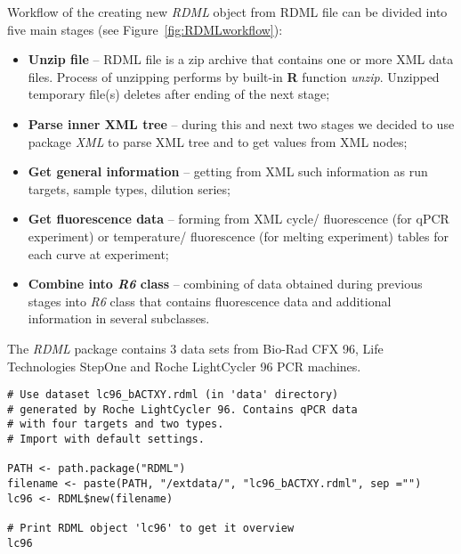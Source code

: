 \documentclass{bioinfo}
\begin{document}
Workflow of the creating new \textit{RDML} object from RDML file can be divided into five main stages (see Figure~\ref{fig:RDMLworkflow}):
\begin{itemize}
	\item \textbf{Unzip file} -- RDML file is a zip archive that contains one or more XML data files. Process of unzipping performs by built-in \textbf{R} function \textit{unzip}. Unzipped temporary file(s) deletes after ending of the next stage;
	\item \textbf{Parse inner XML tree} -- during this and next two stages we decided to use package \textit{XML} to parse XML tree and to get values from XML nodes;
	\item \textbf{Get general information} -- getting from XML such information as run targets, sample types, dilution series;
	\item \textbf{Get fluorescence data} -- forming from XML cycle/ fluorescence (for qPCR experiment) or temperature/ fluorescence (for melting experiment) tables for each curve at experiment;
	\item \textbf{Combine into \textit{R6} class} -- combining of data obtained during previous stages into \textit{R6} class that contains fluorescence data and additional information in several subclasses.
\end{itemize}

The \textit{RDML} package contains 3 data sets from Bio-Rad CFX 96, Life Technologies StepOne and Roche LightCycler 96 PCR machines.
\begin{figure*}
	\caption[]{\textit{RDML} workflow representation.}
	\label{fig:RDMLworkflow}
\end{figure*}

\begin{figure*}
\begin{verbatim}
# Use dataset lc96_bACTXY.rdml (in 'data' directory)
# generated by Roche LightCycler 96. Contains qPCR data
# with four targets and two types.
# Import with default settings.

PATH <- path.package("RDML")
filename <- paste(PATH, "/extdata/", "lc96_bACTXY.rdml", sep ="")
lc96 <- RDML$new(filename)

# Print RDML object 'lc96' to get it overview
lc96
\end{verbatim}
\end{figure*}
\end{document}
